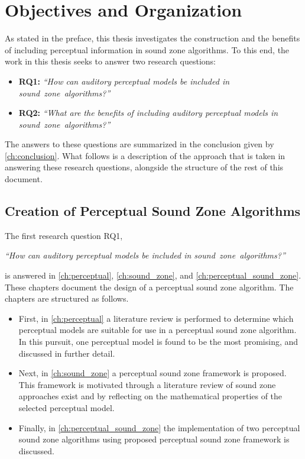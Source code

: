 \section{Objectives and Organization}
\label{ch:introduction:objectives}
As stated in the preface, this thesis investigates the construction and 
the benefits of including perceptual information in sound zone algorithms.
To this end, the work in this thesis seeks to answer two research questions:
\begin{itemize}
    \item \textbf{RQ1:} {\textit{``How can auditory perceptual models be included in sound~zone~algorithms?''}}
    \item \textbf{RQ2:} {\textit{``What are the benefits of including auditory perceptual models in sound~zone~algorithms?''}}
\end{itemize}

The answers to these questions are summarized in the conclusion given by \autoref{ch:conclusion}. 
What follows is a description of the approach that is taken in answering these research questions, 
alongside the structure of the rest of this document.

\subsection{Creation of Perceptual Sound Zone Algorithms}
The first research question RQ1, 

\begin{center}
    {\textit{``How can auditory perceptual models be included in sound~zone~algorithms?''}}
\end{center}

is answered in \autoref{ch:perceptual}, \autoref{ch:sound_zone}, and \autoref{ch:perceptual_sound_zone}.
These chapters document the design of a perceptual sound zone algorithm.
The chapters are structured as follows.
\begin{itemize}
    \item First, in \autoref{ch:perceptual} a literature review is performed to determine which perceptual models are 
        suitable for use in a perceptual sound zone algorithm.
        In this pursuit, one perceptual model is found to be the most promising, and discussed in further detail.
    \item Next, in \autoref{ch:sound_zone} a perceptual sound zone framework is proposed.
        This framework is motivated through a literature review of sound zone approaches exist 
        and by reflecting on the mathematical properties of the selected perceptual model.
    \item Finally, in \autoref{ch:perceptual_sound_zone} the implementation of two perceptual sound zone algorithms 
        using proposed perceptual sound zone framework is discussed.
\end{itemize}

